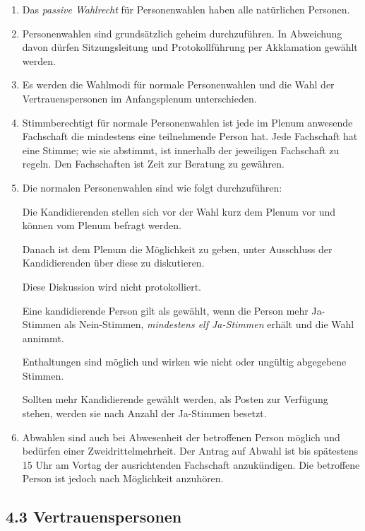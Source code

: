 \documentclass[12pt,oneside]{scrartcl}
\begin{document}
\begin{enumerate}
\item Das \emph{passive Wahlrecht} für Personenwahlen haben alle natürlichen Personen.

\item Personenwahlen sind grundsätzlich geheim durchzuführen.
In Abweichung davon dürfen Sitzungsleitung und Protokollführung per
Akklamation gewählt werden.

\item Es werden die Wahlmodi für normale Personenwahlen und die Wahl der
Vertrauenspersonen im Anfangsplenum unterschieden.

\item Stimmberechtigt für normale Personenwahlen ist jede im Plenum anwesende
Fachschaft die mindestens eine teilnehmende Person hat.
Jede Fachschaft hat eine Stimme; wie sie abstimmt, ist innerhalb der
jeweiligen Fachschaft zu regeln.
Den Fachschaften ist Zeit zur Beratung zu gewähren.

\item Die normalen Personenwahlen sind wie folgt durchzuführen:

Die Kandidierenden stellen sich vor der Wahl kurz dem Plenum vor und können
vom Plenum befragt werden.

Danach ist dem Plenum die Möglichkeit zu geben, unter Ausschluss der
Kandidierenden über diese zu diskutieren.

Diese Diskussion wird nicht protokolliert.

Eine kandidierende Person gilt als gewählt, wenn die Person mehr Ja-Stimmen
als Nein-Stimmen, \emph{mindestens elf Ja-Stimmen} erhält und die Wahl annimmt.

Enthaltungen sind möglich und wirken wie nicht oder ungültig abgegebene
Stimmen.

Sollten mehr Kandidierende gewählt werden, als Posten zur Verfügung stehen,
werden sie nach Anzahl der Ja-Stimmen besetzt.

\item Abwahlen sind auch bei Abwesenheit der betroffenen Person möglich und
bedürfen einer Zweidrittelmehrheit. Der Antrag auf Abwahl ist bis spätestens
15 Uhr am Vortag der ausrichtenden Fachschaft anzukündigen.
Die betroffene Person ist jedoch nach Möglichkeit anzuhören.
\end{enumerate}


\subsection{4.3 Vertrauenspersonen%
  \label{vertrauenspersonen}%
}
\end{document}
